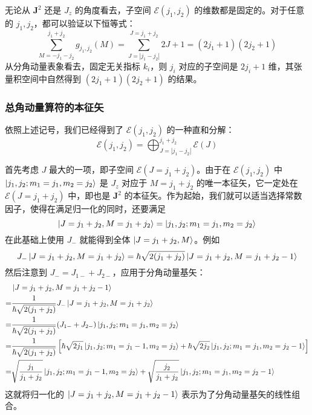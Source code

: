 \documentclass[cn,10pt,math=newtx,citestyle=gb7714-2015,bibstyle=gb7714-2015]{elegantbook}
\def\bm{\boldsymbol}
\def\ms{\mathscr}
\begin{document}
无论从 $\bm J^2$ 还是 $J_z$ 的角度看去，子空间 $\ms E(j_1,j_2)$ 的维数都是固定的。对于任意的 $j_1,j_2$，都可以验证以下恒等式：
\begin{equation}
    \sum_{M=-j_1-j_2}^{j_1+j_2}g_{j_1,j_2}(M) = \sum_{J=|j_1-j_2|}^{J=j_1+j_2}2J+1 = (2j_1+1)(2j_2+1)
\end{equation}
从分角动量表象看去，固定无关指标 $k_i$，则 $j_i$ 对应的子空间是 $2j_i+1$ 维，其张量积空间中自然得到 $(2j_1+1)(2j_2+1)$ 的结果。

\subsubsection{总角动量算符的本征矢}

依照上述记号，我们已经得到了 $\ms E(j_1,j_2)$ 的一种直和分解：
\begin{equation}
    \ms E(j_1,j_2) = \bigoplus_{J=|j_1-j_2|}^{j_1+j_2}\ms E(J)
\end{equation}

首先考虑 $J$ 最大的一项，即子空间 $\ms E(J=j_1+j_2)$。由于在 $\ms E(j_1,j_2)$ 中 $\ket{j_1,j_2;m_1=j_1,m_2=j_2}$ 是 $J_z$ 对应于 $M=j_1+j_2$ 的唯一本征矢，它一定处在 $\ms E(J=j_1+j_2)$ 中，即也是 $\bm J^2$ 的本征矢。作为起始，我们就可以适当选择常数因子，使得在满足归一化的同时，还要满足
\begin{equation}
    \ket{J=j_1+j_2,M=j_1+j_2} =\ket{j_1,j_2;m_1=j_1,m_2=j_2} 
\end{equation}
在此基础上使用 $J_-$ 就能得到全体 $\ket{J=j_1+j_2,M}$。例如
\begin{equation}
    J_-\ket{J=j_1+j_2,M=j_1+j_2} = \hbar\sqrt{2(j_1+j_2)}\ket{J=j_1+j_2,M=j_1+j_2-1}
\end{equation}
然后注意到 $J_-=J_{1-}+J_{2-}$，应用于分角动量基矢：
\begin{align}\label{eq:sprtd_anglr_mmntm_dcmps_1}
    &\ket{J=j_1+j_2,M=j_1+j_2-1} \nonumber\\=& \frac 1{\hbar\sqrt{2(j_1+j_2)}}J_-\ket{J=j_1+j_2,M=j_1+j_2}\nonumber\\
    =&  \frac 1{\hbar\sqrt{2(j_1+j_2)}}(J_{1-}+J_{2-})\ket{j_1,j_2;m_1=j_1,m_2=j_2} \nonumber\\
    = & \frac 1{\hbar\sqrt{2(j_1+j_2)}}\left[\hbar\sqrt{2j_1}\ket{j_1,j_2;m_1=j_1-1,m_2=j_2}+\hbar\sqrt{2j_2}\ket{j_1,j_2;m_1=j_1,m_2=j_2-1}\right]\nonumber\\
    = & \sqrt{\frac{j_1}{j_1+j_2}}\ket{j_1,j_2;m_1=j_1-1,m_2=j_2}+\sqrt{\frac{j_2}{j_1+j_2}}\ket{j_1,j_2;m_1=j_1,m_2=j_2-1}
\end{align}
这就将归一化的 $\ket{J=j_1+j_2,M=j_1+j_2-1}$ 表示为了分角动量基矢的线性组合。
\end{document}
